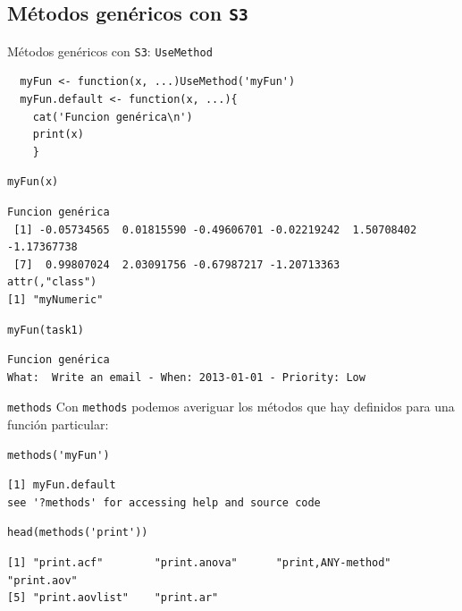 \documentclass[xcolor={usenames,svgnames,dvipsnames}]{beamer}
\begin{document}
\subsection{Métodos genéricos con \texttt{S3}}
\label{sec:orgheadline19}
\begin{frame}[fragile,label={sec:orgheadline16}]{Métodos genéricos con \texttt{S3}: \texttt{UseMethod}}
 \lstset{language=R,label= ,caption= ,captionpos=b,numbers=none}
\begin{lstlisting}
  myFun <- function(x, ...)UseMethod('myFun')
  myFun.default <- function(x, ...){
    cat('Funcion genérica\n')
    print(x)
    }
\end{lstlisting}

\lstset{language=R,label= ,caption= ,captionpos=b,numbers=none}
\begin{lstlisting}
myFun(x)
\end{lstlisting}

\begin{verbatim}
Funcion genérica
 [1] -0.05734565  0.01815590 -0.49606701 -0.02219242  1.50708402 -1.17367738
 [7]  0.99807024  2.03091756 -0.67987217 -1.20713363
attr(,"class")
[1] "myNumeric"
\end{verbatim}

\lstset{language=R,label= ,caption= ,captionpos=b,numbers=none}
\begin{lstlisting}
myFun(task1)
\end{lstlisting}

\begin{verbatim}
Funcion genérica
What:  Write an email - When: 2013-01-01 - Priority: Low
\end{verbatim}
\end{frame}

\begin{frame}[fragile,label={sec:orgheadline17}]{\texttt{methods}}
 Con \texttt{methods} podemos averiguar los métodos que hay definidos para una función particular:
\lstset{language=R,label= ,caption= ,captionpos=b,numbers=none}
\begin{lstlisting}
methods('myFun')
\end{lstlisting}

\begin{verbatim}
[1] myFun.default
see '?methods' for accessing help and source code
\end{verbatim}

\lstset{language=R,label= ,caption= ,captionpos=b,numbers=none}
\begin{lstlisting}
head(methods('print'))
\end{lstlisting}

\begin{verbatim}
[1] "print.acf"        "print.anova"      "print,ANY-method" "print.aov"       
[5] "print.aovlist"    "print.ar"
\end{verbatim}
\end{frame}
\end{document}

